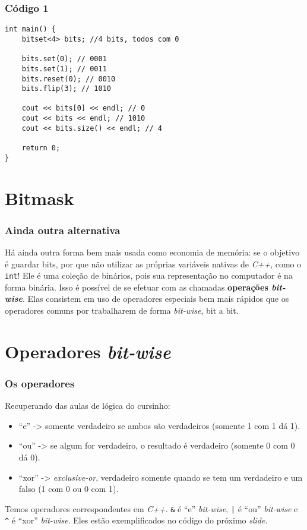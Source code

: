 \documentclass{beamer}
\begin{document}
	\begin{frame}[fragile]
	\frametitle{Código 1}
		\begin{lstlisting}
int main() {
    bitset<4> bits; //4 bits, todos com 0

    bits.set(0); // 0001
    bits.set(1); // 0011
    bits.reset(0); // 0010
    bits.flip(3); // 1010

    cout << bits[0] << endl; // 0
    cout << bits << endl; // 1010
    cout << bits.size() << endl; // 4

    return 0;
}
		\end{lstlisting}
	\end{frame}

	\section{Bitmask}

	\begin{frame}
	\frametitle{Ainda outra alternativa}
	Há ainda outra forma bem mais usada como economia de memória: se o objetivo
	é guardar bits, por que não utilizar as próprias variáveis nativas de \textit{C++},
	como o \texttt{int}! Ele é uma coleção de binários, pois sua representação no
	computador é na forma binária. Isso é possível de se efetuar com as chamadas
	\textbf{operações \textit{bit-wise}}. Elas consistem em uso de operadores especiais
	bem mais rápidos que os operadores comuns por trabalharem de forma \textit{bit-wise},
	bit a bit.
	\end{frame}

	\section{Operadores \textit{bit-wise}}

	\begin{frame}
	\frametitle{Os operadores}
	Recuperando das aulas de lógica do cursinho:

	\begin{itemize}
		\item ``e'' -> somente verdadeiro se ambos são verdadeiros (somente 1 com 1 dá 1).
		\item ``ou'' -> se algum for verdadeiro, o resultado é verdadeiro (somente 0 com 0 dá 0).
		\item ``xor'' -> \textit{exclusive-or}, verdadeiro somente quando se tem um verdadeiro e um falso (1 com 0 ou 0 com 1).
	\end{itemize}
	Temos operadores correspondentes em \textit{C++}. \texttt{\&} é ``e'' \textit{bit-wise}, \texttt{|} é ``ou'' \textit{bit-wise} e \texttt{\^} é ``xor'' \textit{bit-wise}. Eles estão exemplificados no código do próximo \textit{slide}.
	\end{frame}
\end{document}
